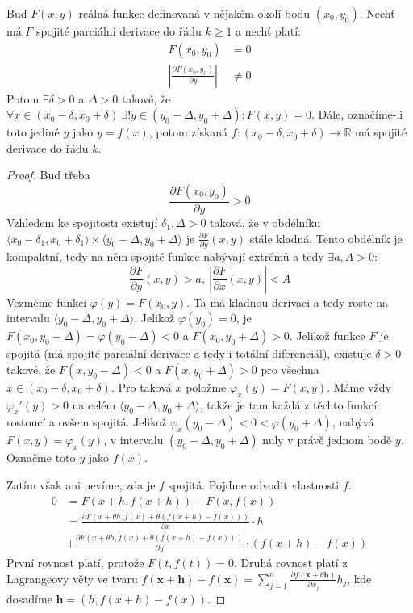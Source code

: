 \documentclass[../main.tex]{subfiles}
\begin{document}
\begin{theorem}
	Buď $F(x,y)$ reálná funkce definovaná v nějakém okolí bodu $(x_0, y_0)$. Nechť má $F$ spojité parciální
	derivace do řádu $k \geq 1$ a nechť platí:
	\begin{align*}
	    F(x_0, y_0) &= 0\\
	    \left| \frac{\partial F(x_0,y_0)}{\partial y} \right| &\neq 0
	\end{align*}
	Potom $ \exists \delta > 0$ a $\Delta > 0$ takové, že
	$\forall x \in (x_0 - \delta , x_0 + \delta)\ \exists! y \in (y_0 - \Delta , y_0 + \Delta): F(x,y) = 0$.
	Dále, označíme-li toto jediné $y$ jako $y = f(x)$, potom získaná
	$f: (x_0 - \delta , x_0 + \delta ) \to \mathbb{R}$ má spojité derivace do řádu $k$.
\end{theorem}

\begin{proof}
	Buď třeba
	$$
	\frac{\partial F(x_0, y_0)}{\partial y} > 0
	$$
	Vzhledem ke spojitosti existují $\delta_1, \Delta > 0$ taková, že v
	obdélníku $\langle x_0 - \delta_1, x_0 + \delta_1 \rangle \times
	\langle y_0 - \Delta, y_0 + \Delta \rangle$ je $\frac{\partial
	F}{\partial y} (x, y)$ stále kladná. Tento obdélník je kompaktní, tedy
	na něm spojité funkce nabývají extrémů a tedy
	$\exists a, A > 0:$
	$$
	\frac{\partial F}{\partial y}(x, y) > a,~ \left |
	\frac{\partial F}{\partial x}(x, y) \right | < A
	$$
	Vezměme funkci $\varphi(y) = F(x_0, y)$. Ta má kladnou derivaci a tedy
	roste na intervalu $\langle y_0 - \Delta, y_0 + \Delta \rangle$.
	Jelikož $\varphi(y_0) = 0$, je $F(x_0, y_0 - \Delta) = \varphi(y_0 -
	\Delta) < 0$ a $F(x_0, y_0 + \Delta) > 0$. Jelikož funkce $F$ je
	spojitá (má spojité parciální derivace a tedy i totální diferenciál),
	existuje $\delta > 0$ takové, že $F(x, y_0 - \Delta) < 0$ a $F(x, y_0 +
	\Delta) > 0$ pro všechna $x \in (x_0 - \delta, x_0 + \delta)$. Pro
	taková $x$ položme $\varphi_x(y) = F(x, y)$. Máme vždy $\varphi_x'(y) >
	0$ na celém $\langle y_0 - \Delta, y_0 + \Delta \rangle$, takže je tam
	každá z těchto funkcí rostoucí a ovšem spojitá. Jelikož $\varphi_x(y_0
	- \Delta) < 0 < \varphi(y_0 + \Delta)$, nabývá $F(x, y) =
	\varphi_x(y)$, v intervalu $(y_0 - \Delta, y_0 + \Delta)$ nuly v právě
	jednom bodě $y$. Označme toto $y$ jako $f(x)$.

	Zatím však ani nevíme, zda je $f$ spojitá. Pojďme odvodit vlastnosti
	$f$.
	\begin{align*}
		0 &= F(x + h, f(x + h)) - F(x, f(x)) \\
		&= \frac{\partial F (x + \theta h, f(x) + \theta (f(x + h) -
		f(x)))}{\partial x} \cdot h \\
		&+ \frac{\partial F (x + \theta h, f(x) + \theta (f(x + h) -
		f(x)))}{\partial y} \cdot (f(x + h) - f(x))
	\end{align*}
	První rovnost platí, protože $F(t, f(t)) = 0$. Druhá rovnost platí z
	Lagrangeovy věty ve tvaru $f(\mathbf{x} + \mathbf{h}) - f(\mathbf{x}) =
	\sum_{j=1}^{n} \frac{\partial f(\mathbf{x} + \theta
	\mathbf{h})}{\partial x_j}h_j$, kde dosadíme $\mathbf{h} = (h, f(x + h)
	- f(x))$.


\end{proof}
\end{document}

